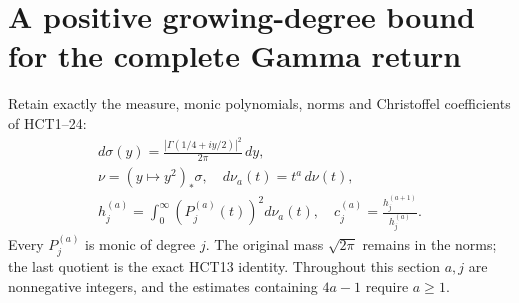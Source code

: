 \documentclass[11pt,a4paper]{article}
\begin{document}
\section{A positive growing-degree bound for the complete Gamma return}
\label{sec:RWB}

Retain exactly the measure, monic polynomials, norms and Christoffel
coefficients of HCT1--24:
\[
 \begin{gathered}
 d\sigma(y)=\frac{|\Gamma(1/4+iy/2)|^2}{2\pi}\,dy,\\
 \nu=(y\mapsto y^2)_*\sigma,
 \quad d\nu_a(t)=t^a\,d\nu(t),\\
 h_j^{(a)}=\int_0^\infty(P_j^{(a)}(t))^2d\nu_a(t),
 \quad c_j^{(a)}=\frac{h_j^{(a+1)}}{h_j^{(a)}}.
 \end{gathered}
 \tag{RWB1}
\]
Every $P_j^{(a)}$ is monic of degree $j$. The original mass
$\sqrt{2\pi}$ remains in the norms; the last quotient is the exact HCT13
identity. Throughout this section $a,j$ are nonnegative integers, and
the estimates containing $4a-1$ require $a\ge1$.
\end{document}
